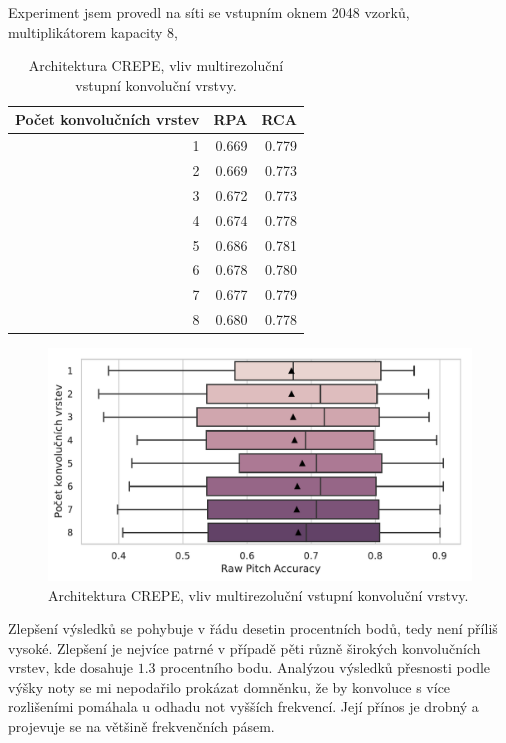 Experiment jsem provedl na síti se vstupním oknem 2048 vzorků, multiplikátorem kapacity 8, 

\begin{table}[h!]
\centering
    \begin{tabular}{rrr}
    \toprule
    Počet konvolučních vrstev &   RPA &   RCA \\
    \midrule
                            1 & 0.669 & 0.779 \\
                            2 & 0.669 & 0.773 \\
                            3 & 0.672 & 0.773 \\
                            4 & 0.674 & 0.778 \\
                            5 & 0.686 & 0.781 \\
                            6 & 0.678 & 0.780 \\
                            7 & 0.677 & 0.779 \\
                            8 & 0.680 & 0.778 \\
    \bottomrule
    \end{tabular}
\caption{Architektura CREPE, vliv multirezoluční vstupní konvoluční vrstvy.}\label{tab:crepe_multirozliseni}
\end{table}

\begin{figure}[h]\centering
    \includegraphics[scale=0.6]{../img/figures/crepe_multirozliseni.pdf}
\caption{Architektura CREPE, vliv multirezoluční vstupní konvoluční vrstvy.}\label{obr:crepe_multirozliseni}
\end{figure}

Zlepšení výsledků se pohybuje v řádu desetin procentních bodů, tedy není příliš vysoké. Zlepšení je nejvíce patrné v případě pěti různě širokých konvolučních vrstev, kde dosahuje $1.3$ procentního bodu. Analýzou výsledků přesnosti podle výšky noty se mi nepodařilo prokázat domněnku, že by konvoluce s více rozlišeními pomáhala u odhadu not vyšších frekvencí. Její přínos je drobný a projevuje se na většině frekvenčních pásem.


